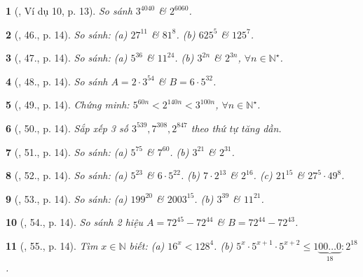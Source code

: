 \documentclass{article}
\newtheorem{baitoan}{}
\begin{document}
\begin{baitoan}[\cite{Tuyen_Toan_6}, Ví dụ 10, p. 13]
	So sánh $3^{4040}$ \& $2^{6060}$.
\end{baitoan}

\begin{baitoan}[\cite{Tuyen_Toan_6}, 46., p. 14]
	So sánh: (a) $27^{11}$ \& $81^8$. (b) $625^5$ \& $125^7$.
\end{baitoan}

\begin{baitoan}[\cite{Tuyen_Toan_6}, 47., p. 14]
	So sánh: (a) $5^{36}$ \& $11^{24}$. (b) $3^{2n}$ \& $2^{3n}$, $\forall n\in\mathbb{N}^\star$.
\end{baitoan}

\begin{baitoan}[\cite{Tuyen_Toan_6}, 48., p. 14]
	So sánh $A = 2\cdot3^{54}$ \& $B = 6\cdot5^{32}$.
\end{baitoan}

\begin{baitoan}[\cite{Tuyen_Toan_6}, 49., p. 14]
	Chứng minh: $5^{60n} < 2^{140n} < 3^{100n}$, $\forall n\in\mathbb{N}^\star$.
\end{baitoan}

\begin{baitoan}[\cite{Tuyen_Toan_6}, 50., p. 14]
	Sắp xếp 3 số $3^{539},7^{308},2^{847}$ theo thứ tự tăng dần.
\end{baitoan}

\begin{baitoan}[\cite{Tuyen_Toan_6}, 51., p. 14]
	So sánh: (a) $5^{75}$ \& $7^{60}$. (b) $3^{21}$ \& $2^{31}$.
\end{baitoan}

\begin{baitoan}[\cite{Tuyen_Toan_6}, 52., p. 14]
	So sánh: (a) $5^{23}$ \& $6\cdot5^{22}$. (b) $7\cdot2^{13}$ \& $2^{16}$. (c) $21^{15}$ \& $27^5\cdot49^8$.
\end{baitoan}

\begin{baitoan}[\cite{Tuyen_Toan_6}, 53., p. 14]
	So sánh: (a) $199^{20}$ \& $2003^{15}$. (b) $3^{39}$ \& $11^{21}$.
\end{baitoan}

\begin{baitoan}[\cite{Tuyen_Toan_6}, 54., p. 14]
	So sánh 2 hiệu $A = 72^{45} - 72^{44}$ \& $B = 72^{44} - 72^{43}$.
\end{baitoan}

\begin{baitoan}[\cite{Tuyen_Toan_6}, 55., p. 14]
	Tìm $x\in\mathbb{N}$ biết: (a) $16^x < 128^4$. (b) $5^x\cdot5^{x + 1}\cdot5^{x + 2}\le1\underbrace{00\ldots0}_{18}:2^{18}$.
\end{baitoan}
\end{document}
